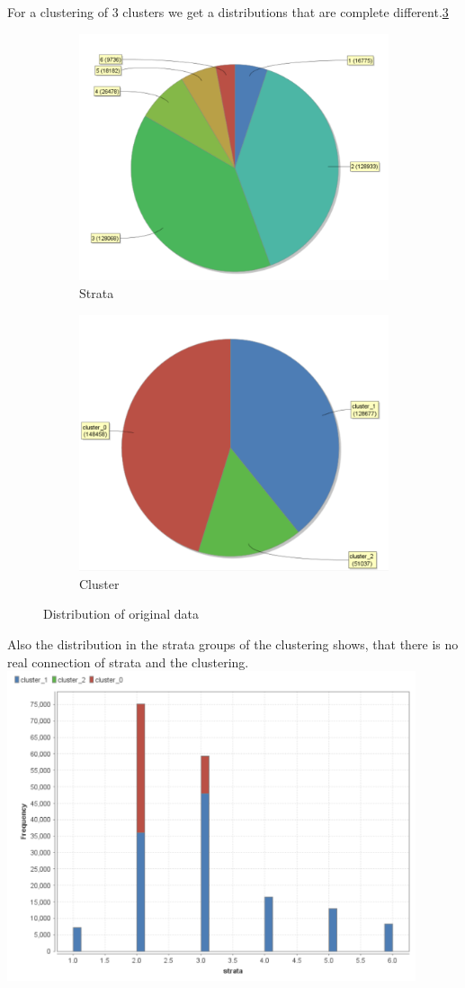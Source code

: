 For a clustering of 3 clusters we get a distributions that are complete different.\ref{fig:OrgDist}
\begin{figure}[h]
\centering
\begin{subfigure}{.5\textwidth}
  \centering
  \includegraphics[width=.4\linewidth]{../Miriam-RapidMiner/ClusterOrigRapidStrata2Cluster.PNG}
  \caption{Strata}
  \label{fig:OrgSt}
\end{subfigure}%
\begin{subfigure}{.5\textwidth}
  \centering
  \includegraphics[width=.4\linewidth]{../Miriam-RapidMiner/ClusterOrigRapidCluster2Cluster.PNG}
  \caption{Cluster}
  \label{fig:OrgCl}
\end{subfigure}
\caption{Distribution of original data}
\label{fig:OrgDist}
\end{figure}

Also the distribution in the strata groups of the clustering shows, that there is no real connection of strata and the clustering.
\includegraphics[width=0.9\textwidth]{../Miriam-RapidMiner/ClusterOrigRapidDistribution2Cluster.PNG}

